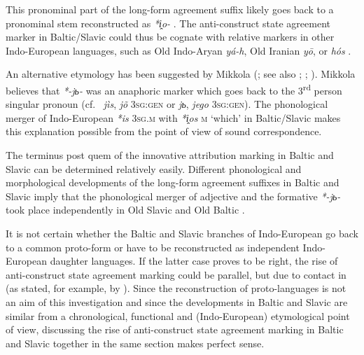This pronominal part of the long-form agreement suffix likely goes back to a pronominal stem reconstructed as  \textit{*i̭o-} \citep[61]{wissemann1958}. The anti-construct state agreement marker in Baltic\slash{}Slavic could thus be cognate with relative markers in other Indo-European languages, such as Old Indo-Aryan \textit{yá-h}, Old Iranian \textit{yō}, or  \textit{hós} \cite[53]{heinrichs1954}.

An alternative etymology has been suggested by Mikkola (\citeyear[52]{mikkola1950}; %
 see also \citealt[102]{leskien1871}; \citealt[164–165]{leskien1919}; \citealt[19ff.]{wijk1935}). Mikkola believes that  \textit{*-jь-} was an anaphoric marker which goes back to the 3\textsuperscript{rd} person singular pronoun (cf.~ \textit{jìs}, \textit{jõ} \textsc{3sg:gen} or  \textit{jь}, \textit{jego} \textsc{3sg:gen}). The phonological merger of Indo-European \textit{*is} \textsc{3sg.m} with \textit{\textit{*i̭os}} \textsc{m} ‘which’ in Baltic\slash{}Slavic \cite[21 Footnote 8]{schmidt1959} makes this explanation possible from the point of view of sound correspondence.

The terminus post quem of the innovative attribution marking in Baltic and Slavic can be determined relatively easily. Different phonological and morphological developments of the long-form agreement suffixes in Baltic and Slavic imply that the phonological merger of adjective and the formative \textit{*-jь-} took place independently in Old Slavic and Old Baltic \citep[64–65]{koch1992}. 

It is not certain whether the Baltic and Slavic branches of Indo-European go back to a common proto-form or  have to be reconstructed as independent Indo-European daughter languages. If the latter case proves to be right, the rise of anti-construct state agreement marking could be parallel, but due to contact in  (as stated, for example, by \citealt[77]{pohl1980}). Since the reconstruction of proto-languages is not an aim of this investigation and since the developments in Baltic and Slavic are similar from a chronological, functional and (Indo-European) etymological point of view, discussing the rise of anti-construct state agreement marking in Baltic and Slavic together in the same section makes perfect sense.

